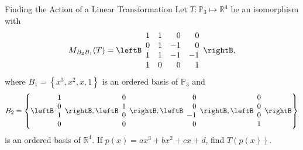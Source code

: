 \begin{example}{Finding the Action of a Linear Transformation}\label{exa:actionlinear}
Let $T: \mathbb{P}_3 \mapsto \mathbb{R}^4$ be an isomorphism with
\[
M_{B_2B_1}(T) = \leftB \begin{array}{rrrr}
1 & 1 & 0 & 0 \\
0 & 1 & -1 & 0 \\
1 & 1 & -1 & -1 \\
1 & 0 & 0 & 1 
\end{array} \rightB,
\]
where $B_1 = \left\{ x^3, x^2, x, 1 \right\}$ is an ordered basis of $\mathbb{P}_3$ and 
\[
B_2 = \left\{ \leftB \begin{array}{r}
1 \\
0 \\
1 \\
0
\end{array} \rightB, \leftB \begin{array}{r}
0 \\
1 \\
0 \\
0
\end{array} \rightB, 
\leftB \begin{array}{r}
0 \\
0 \\
-1 \\
0
\end{array} \rightB, 
\leftB \begin{array}{r}
0 \\
0 \\
0 \\
1
\end{array} \rightB \right\} 
\]
is an ordered basis of $\mathbb{R}^4$. If $p(x) = ax^3 + bx^2 + cx + d$, find $T(p(x))$. 
\end{example}

